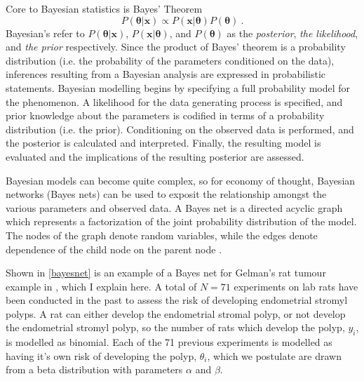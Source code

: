 Core to Bayesian statistics is Bayes' Theorem
%
\begin{equation}\label{Bayes}
	P( \bm{\theta} \vert \mathbf{x}) \propto P(\mathbf{x} \vert \bm{\theta}) P(\bm{\theta}) \>.
\end{equation}
%
Bayesian's refer to $  P( \bm{\theta} \vert \mathbf{x}) $, $ P(\mathbf{x} \vert \bm{\theta})  $, and $P(\bm{\theta})$ as the \textit{posterior}, \textit{the likelihood}, and \textit{the prior} respectively.  Since the product of Bayes' theorem is a probability distribution (i.e. the probability of the parameters conditioned on the data), inferences resulting from a Bayesian analysis are expressed in probabilistic statements. Bayesian modelling begins by specifying a full probability model for the phenomenon.  A likelihood for the data generating process is specified, and prior knowledge about the parameters is codified in terms of a probability distribution (i.e. the prior).  Conditioning on the observed data is performed, and the posterior is calculated and interpreted.  Finally, the resulting model is evaluated and the implications of the resulting posterior are assessed.

Bayesian models can become quite complex, so for economy of thought, Bayesian networks (Bayes nets) can be used to exposit the relationship amongst the various parameters and observed data.  A Bayes net is a directed acyclic graph which represents a factorization of the joint probability distribution of the model. The nodes of the graph denote random variables, while the edges denote dependence of the child node on the parent node \cite{Bishop2006pattern}. 

Shown in \cref{bayesnet} is an example of a Bayes net for Gelman's rat tumour example in \cite{gelman2013bayesian}, which I explain here.  A total of $ N = 71 $ experiments on lab rats have been conducted in the past to assess the risk of developing endometrial stromyl polyps.  A rat can either develop the endometrial stromal polyp, or not develop the endometrial stromyl polyp, so the number of rats which develop the polyp, $ y_i $, is modelled as binomial.  Each of the 71 previous experiments is modelled as having it's own risk of developing the polyp, $ \theta_i $, which we postulate are drawn from a beta distribution with parameters $ \alpha $ and $ \beta $.  

